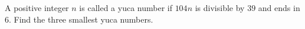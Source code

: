 A positive integer $n$ is called a yuca number if $104n$ is divisible by $39$ and ends in $6$. Find the three smallest yuca numbers.
